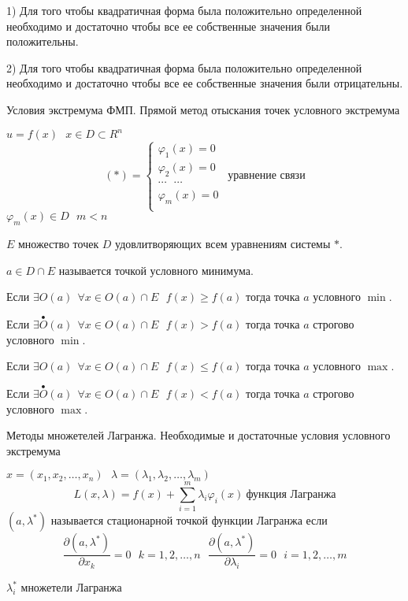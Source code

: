 \begin{block}
  1) Для того чтобы квадратичная форма была положительно определенной
  необходимо и достаточно чтобы все ее собственные значения были положительны.

  2) Для того чтобы квадратичная форма была положительно определенной
  необходимо и достаточно чтобы все ее собственные значения были отрицательны.
\end{block}

\begin{title}[\Large]
  Условия экстремума ФМП. Прямой метод отыскания точек условного экстремума
\end{title}

\begin{define}
  $u = f(x) ~~~ x \in D \subset R^n$
  $$
  (*) =
  \left\{
  \begin{array}{c}
    \varphi_1(x) = 0 \\
    \varphi_2(x) = 0 \\
    \cdots ~~~ \cdots \\
    \varphi_m(x) = 0 \\
  \end{array}
  \right. ~~ \text{уравнение связи}
  $$
  $\varphi_m(x) \in D ~~~ m < n$

  $E$ множество точек $D$ удовлитворяющих всем уравнениям системы $*$.

  $a \in D \cap E$ называется точкой условного минимума.

  Если $\exists O(a) ~~ \forall x \in O(a) \cap E ~~~ f(x) \ge f(a)$
  тогда точка $a$ условного $\min$.

  Если $\exists \stackrel{\bullet}{O}(a) ~~ \forall x \in O(a) \cap E
  ~~~ f(x) > f(a)$ тогда точка $a$ строгово условного $\min$.

  Если $\exists O(a) ~~ \forall x \in O(a) \cap E ~~~ f(x) \le f(a)$
  тогда точка $a$ условного $\max$.

  Если $\exists \stackrel{\bullet}{O}(a) ~~ \forall x \in O(a) \cap E
  ~~~ f(x) < f(a)$ тогда точка $a$ строгово условного $\max$.
\end{define}

\begin{title}[\Large]
  Методы множетелей Лагранжа. Необходимые и достаточные условия условного
  экстремума
\end{title}

\begin{define}
  $x = (x_1, x_2, \ldots, x_n) ~~~ \lambda = (\lambda_1, \lambda_2, \ldots,
  \lambda_m)$
  $$
  L(x, \lambda) = f(x) + \sum_{i=1}^m \lambda_i \varphi_i(x) ~ \text{
  функция Лагранжа}
  $$
  $(a, \lambda^*)$ называется стационарной точкой функции Лагранжа если
  $$
  \frac{\partial (a, \lambda^*)}{\partial x_k} = 0 ~~~ k = 1,2, \ldots, n ~~~
  \frac{\partial (a, \lambda^*)}{\partial \lambda_i} = 0 ~~~ i = 1,2, \ldots, m
  $$

  $\lambda_i^*$ множетели Лагранжа
\end{define}

